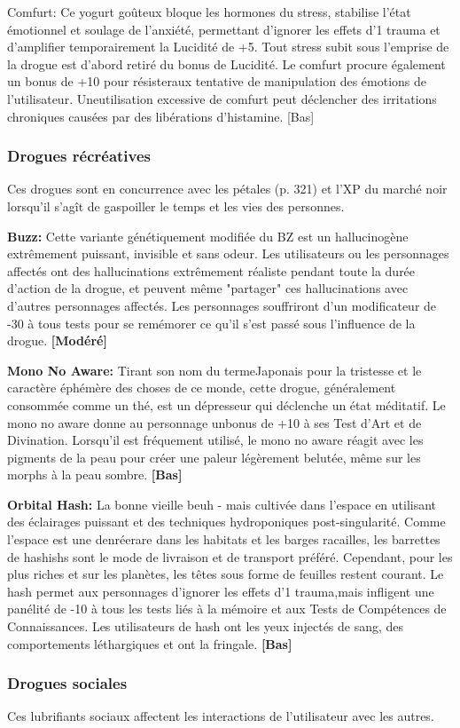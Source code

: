 Comfurt: Ce yogurt goûteux bloque les hormones du stress, stabilise l'état émotionnel et soulage de l'anxiété, permettant d'ignorer les effets d'1 trauma et d'amplifier temporairement la Lucidité de +5. Tout stress subit sous l'emprise de la drogue est d'abord retiré du bonus de Lucidité. Le comfurt procure également un bonus de +10 pour résisteraux tentative de manipulation des émotions de l'utilisateur. Uneutilisation excessive de comfurt peut déclencher des irritations chroniques causées par des libérations d'histamine. [Bas] 

\subsubsection{Drogues récréatives} 

Ces drogues sont en concurrence avec les pétales (p. 321) et l'XP du marché noir lorsqu'il s'agît de gaspoiller le temps et les vies des personnes. 

\textbf{Buzz:} Cette variante génétiquement modifiée du BZ est un hallucinogène extrêmement puissant, invisible et sans odeur. Les utilisateurs ou les personnages affectés ont des hallucinations extrêmement réaliste pendant toute la durée d'action de la drogue, et peuvent même "partager" ces hallucinations avec d'autres personnages affectés. Les personnages souffriront d'un modificateur de -30 à tous tests pour se remémorer ce qu'il s'est passé sous l'influence de la drogue. \textbf{[Modéré]} 

\textbf{Mono No Aware:} Tirant son nom du termeJaponais pour la tristesse et le caractère éphémère des choses de ce monde, cette drogue, généralement consommée comme un thé, est un dépresseur qui déclenche un état méditatif. Le mono no aware donne au personnage unbonus de +10 à ses Test d'Art et de Divination. Lorsqu'il est fréquement utilisé, le mono no aware réagit avec les pigments de la peau pour créer une paleur légèrement belutée, même sur les morphs à la peau sombre. \textbf{[Bas]} 

\textbf{Orbital Hash:} La bonne vieille beuh - mais cultivée dans l'espace en utilisant des éclairages puissant et des techniques hydroponiques post-singularité. Comme l'espace est une denréerare dans les habitats et les barges racailles, les barrettes de hashishs sont le mode de livraison et de transport préféré. Cependant, pour les plus riches et sur les planètes, les têtes sous forme de feuilles restent courant. Le hash permet aux personnages d'ignorer les effets d'1 trauma,mais infligent une panélité de -10 à tous les tests liés à la mémoire et aux Tests de Compétences de Connaissances. Les utilisateurs de hash ont les yeux injectés de sang, des comportements léthargiques et ont la fringale. \textbf{[Bas]}\subsubsection{Drogues sociales} Ces lubrifiants sociaux affectent les interactions de l'utilisateur avec les autres. 

